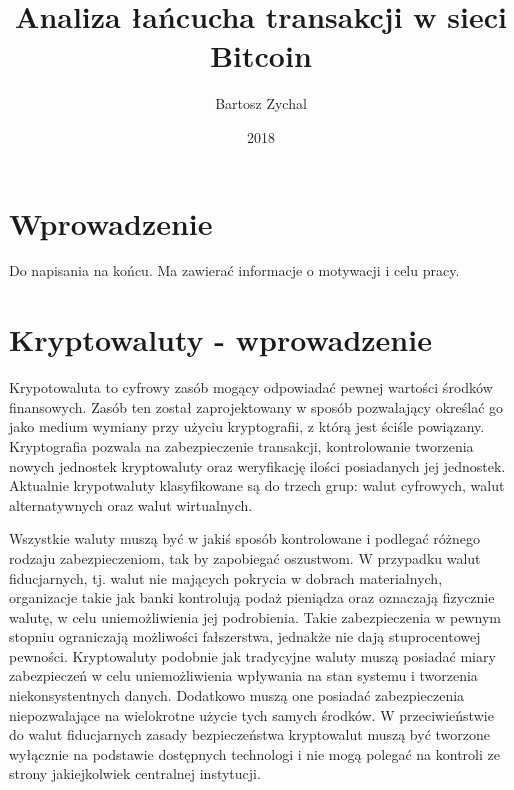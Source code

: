 \documentclass[printmode,oneside]{mgr}
\title{Analiza łańcucha transakcji w sieci Bitcoin}
\author{Bartosz Zychal}
\date{2018} %
\begin{document}
\def\listtablename{Spis tabel}
\def\tablename{Tabela. }

\maketitle %

\chapter{Wprowadzenie}
Do napisania na końcu. Ma zawierać informacje o motywacji i celu pracy. 

\chapter{Kryptowaluty - wprowadzenie}

\indent Krypotowaluta to cyfrowy zasób mogący odpowiadać pewnej wartości środków finansowych. Zasób ten został zaprojektowany w sposób pozwalający określać go jako medium wymiany przy użyciu kryptografii, z którą jest ściśle powiązany. Kryptografia pozwala na zabezpieczenie transakcji, kontrolowanie tworzenia nowych jednostek kryptowaluty oraz weryfikację ilości posiadanych jej jednostek. Aktualnie krypotwaluty klasyfikowane są do trzech grup: walut cyfrowych, walut alternatywnych oraz walut wirtualnych. 

\indent Wszystkie waluty muszą być w jakiś sposób kontrolowane i podlegać różnego rodzaju zabezpieczeniom, tak by zapobiegać oszustwom. W przypadku walut fiducjarnych, tj. walut nie mających pokrycia w dobrach materialnych, organizacje takie jak banki kontrolują podaż pieniądza oraz oznaczają fizycznie walutę, w celu uniemożliwienia jej podrobienia. Takie zabezpieczenia w pewnym stopniu ograniczają możliwości fałszerstwa, jednakże nie dają stuprocentowej pewności. Kryptowaluty podobnie jak tradycyjne waluty muszą posiadać miary zabezpieczeń w celu uniemożliwienia wpływania na stan systemu i tworzenia niekonsystentnych danych. Dodatkowo muszą one posiadać zabezpieczenia niepozwalające na wielokrotne użycie tych samych środków. W przeciwieństwie do walut fiducjarnych  
zasady bezpieczeństwa kryptowalut muszą być tworzone wyłącznie na podstawie dostępnych technologi i nie mogą polegać na kontroli ze strony jakiejkolwiek centralnej instytucji. 
\end{document}
